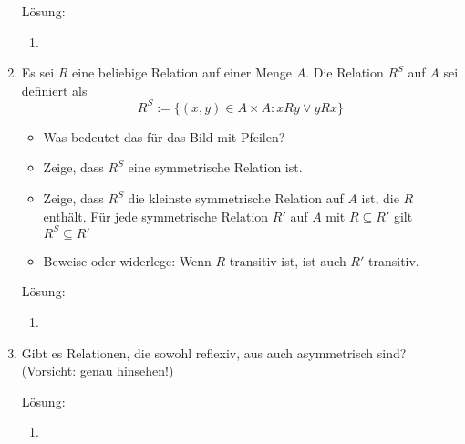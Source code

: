 \documentclass[../main.tex]{subfiles}
\begin{document}
\begin{enumerate}
	      Lösung:
	      \begin{enumerate}
		      \item
	      \end{enumerate}
	\item Es sei \( R \) eine beliebige Relation auf einer Menge \( A \).
	      Die Relation \( R^S \) auf \( A \) sei definiert als
	      \[ R^S := \{ (x,y) \in A \times A : xRy \lor yRx \} \]
	      \begin{itemize}
		      \item Was bedeutet das für das Bild mit Pfeilen?
		      \item Zeige, dass \( R^S \) eine symmetrische Relation ist.
		      \item Zeige, dass \( R^S \) die kleinste symmetrische Relation auf \( A \) ist,
		            die \( R \) enthält.
		            Für jede symmetrische Relation \( R' \) auf \( A \) mit \( R \subseteq R' \)  gilt
		            \( R^S \subseteq R' \)
		      \item Beweise oder widerlege: Wenn \( R \) transitiv ist, ist auch \( R' \) transitiv.
	      \end{itemize}

		Lösung:
	      \begin{enumerate}
		      \item
	      \end{enumerate}
	\item Gibt es Relationen, die sowohl reflexiv, aus auch asymmetrisch sind?
	      (Vorsicht: genau hinsehen!)

	      Lösung:
	      \begin{enumerate}
		      \item
	      \end{enumerate}
\end{enumerate}
\end{document}
